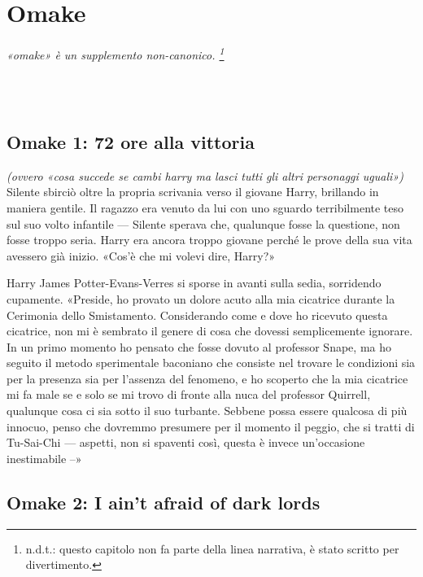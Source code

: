 
\chapter{Omake}
\label{capitolo:11}

\emph{«omake» è un supplemento non-canonico. \footnote{n.d.t.: questo capitolo non fa parte della linea narrativa, è stato scritto per divertimento.}}

~\\
~\\

\section*{Omake 1:  72 ore alla vittoria}

\emph {(ovvero «cosa succede se cambi harry ma lasci tutti gli altri personaggi uguali»)}\\

Silente sbirciò oltre la propria scrivania verso il giovane Harry, brillando in maniera gentile. Il ragazzo era venuto da lui con uno sguardo terribilmente teso sul suo volto infantile — Silente sperava che, qualunque fosse la questione, non fosse troppo seria. Harry era ancora troppo giovane perché le prove della sua vita avessero già inizio. «Cos’è che mi volevi dire, Harry?»

Harry James Potter-Evans-Verres si sporse in avanti sulla sedia, sorridendo cupamente. «Preside, ho provato un dolore acuto alla mia cicatrice durante la Cerimonia dello Smistamento. Considerando come e dove ho ricevuto questa cicatrice, non mi è sembrato il genere di cosa che dovessi semplicemente ignorare. In un primo momento ho pensato che fosse dovuto al professor Snape, ma ho seguito il metodo sperimentale baconiano che consiste nel trovare le condizioni sia per la presenza sia per l’assenza del fenomeno, e ho scoperto che la mia cicatrice mi fa male se e solo se mi trovo di fronte alla nuca del professor Quirrell, qualunque cosa ci sia sotto il suo turbante. Sebbene possa essere qualcosa di più innocuo, penso che dovremmo presumere per il momento il peggio, che si tratti di Tu-Sai-Chi — aspetti, non si spaventi così, questa è invece un’occasione inestimabile –»

\newpage

\section*{Omake 2: I ain’t afraid of dark lords}


